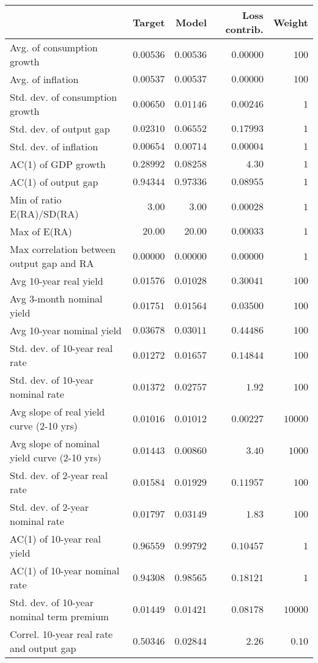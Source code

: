 \begin{tabular}{lrrrr} \hline  & Target & Model & Loss contrib. & Weight \\ \hline Avg. of consumption growth & $0.00536$ & $0.00536$ & $0.00000$ & $100$ \\ Avg. of inflation & $0.00537$ & $0.00537$ & $0.00000$ & $100$ \\ Std. dev. of consumption growth & $0.00650$ & $0.01146$ & $0.00246$ & $1$ \\ Std. dev. of output gap & $0.02310$ & $0.06552$ & $0.17993$ & $1$ \\ Std. dev. of inflation & $0.00654$ & $0.00714$ & $0.00004$ & $1$ \\ AC(1) of GDP growth & $0.28992$ & $0.08258$ & $4.30$ & $1$ \\ AC(1) of output gap & $0.94344$ & $0.97336$ & $0.08955$ & $1$ \\ Min of ratio E(RA)/SD(RA) & $3.00$ & $3.00$ & $0.00028$ & $1$ \\ Max of E(RA) & $20.00$ & $20.00$ & $0.00033$ & $1$ \\ Max correlation between output gap and RA & $0.00000$ & $0.00000$ & $0.00000$ & $1$ \\ Avg 10-year real yield & $0.01576$ & $0.01028$ & $0.30041$ & $100$ \\ Avg 3-month nominal yield & $0.01751$ & $0.01564$ & $0.03500$ & $100$ \\ Avg 10-year nominal yield & $0.03678$ & $0.03011$ & $0.44486$ & $100$ \\ Std. dev. of 10-year real rate & $0.01272$ & $0.01657$ & $0.14844$ & $100$ \\ Std. dev. of 10-year nominal rate & $0.01372$ & $0.02757$ & $1.92$ & $100$ \\ Avg slope of real yield curve (2-10 yrs) & $0.01016$ & $0.01012$ & $0.00227$ & $10000$ \\ Avg slope of nominal yield curve (2-10 yrs) & $0.01443$ & $0.00860$ & $3.40$ & $1000$ \\ Std. dev. of 2-year real rate & $0.01584$ & $0.01929$ & $0.11957$ & $100$ \\ Std. dev. of 2-year nominal rate & $0.01797$ & $0.03149$ & $1.83$ & $100$ \\ AC(1) of 10-year real yield & $0.96559$ & $0.99792$ & $0.10457$ & $1$ \\ AC(1) of 10-year nominal rate & $0.94308$ & $0.98565$ & $0.18121$ & $1$ \\ Std. dev. of 10-year nominal term premium & $0.01449$ & $0.01421$ & $0.08178$ & $10000$ \\ Correl. 10-year real rate and output gap & $0.50346$ & $0.02844$ & $2.26$ & $0.10$ \\ \hline \end{tabular}